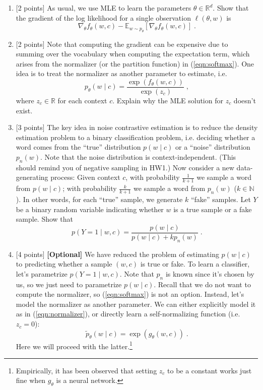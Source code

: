 \documentclass{article}
\theoremstyle{case}
\theoremstyle{definition}
\newcommand{\hint}[1]{\noindent{[\textbf{HINT:} #1]}}
\begin{document}
\begin{enumerate}
    \item {[2 points]} 
        As usual, we use MLE to learn the parameters $\theta\in\mathbb{R}^d$.
        Show that the gradient of the log likelihood for a single observation $\ell(\theta,w)$ is
        $$
        \nabla_\theta f_\theta(w, c)
        - \mathbb{E}_{w\sim p_\theta} [\nabla_\theta f_\theta(w, c)]
        \;.
        $$
    \newpage
    \item {[2 points]}
    Note that computing the gradient can be expensive due to summing over the vocabulary when computing the expectation term,
    which arises from the normalizer (or the partition function) in (\ref{eqn:softmax}).
    One idea is to treat the normalizer as another parameter to estimate, i.e.
        $$
        p_\theta(w\mid c) = \frac{\exp(f_\theta(w, c))}
        {\exp(z_c)} \;,
        \label{eqn:normalizer}
        $$
        where $z_c\in\mathbb{R}$ for each context $c$.
        Explain why the MLE solution for $z_c$ doesn't exist. 


    \newpage
    \item {[3 points]}
    The key idea in noise contrastive estimation is to reduce the density estimation problem to a binary classification problem, i.e.
        deciding whether a word comes from the ``true'' distribution $p(w\mid c)$ or a ``noise'' distribution $p_n(w)$.
        Note that the noise distribution is context-independent.
        (This should remind you of negative sampling in HW1.)
        Now consider a new data-generating process:
        Given context $c$, with probability $\frac{1}{k+1}$ we sample a word from $p(w\mid c)$;
        with probability $\frac{k}{k+1}$ we sample a word from $p_n(w)$ ($k\in \mathbb{N}$).
        In other words, for each ``true'' sample, we generate $k$ ``fake'' samples.
        Let $Y$ be a binary random variable indicating whether $w$ is a true sample or a fake sample.
        Show that 
        $$
        p(Y=1\mid w, c) = \frac{p(w\mid c)}{p(w\mid c) + kp_n(w)} \;.
        $$
        \hint{Use Bayes' rule.}

    \newpage
    \item{[4 points]}
    \textbf{[Optional]}
        We have reduced the problem of estimating $p(w\mid c)$ to predicting whether a sample $(w, c)$ is true or fake.
        To learn a classifier, let's parametrize $p(Y=1\mid w, c)$.
        Note that $p_n$ is known since it's chosen by us, so we just need to parametrize $p(w\mid c)$.
        Recall that we do not want to compute the normalizer, so (\ref{eqn:softmax}) is not an option.
        Instead, let's model the normalizer as another parameter. 
        We can either explicitly model it as in (\ref{eqn:normalizer}),
        or directly learn a self-normalizing function (i.e. $z_c=0$):
        $$
        \tilde{p}_\theta(w\mid c) = \exp (g_\theta(w, c)) \;.
        $$
        Here we will proceed with the latter.\footnote{Empirically, it has been observed that setting $z_c$ to be a constant works just fine when $g_\theta$ is a neural network.}
        

\end{enumerate}
\end{document}
